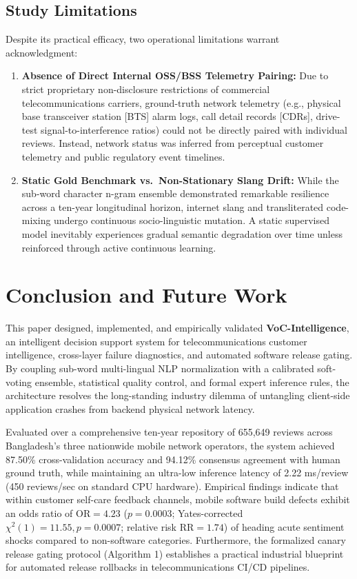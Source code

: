 \documentclass[review,12pt,authoryear]{elsarticle}
\begin{document}
\subsection{Study Limitations}
Despite its practical efficacy, two operational limitations warrant acknowledgment:
\begin{enumerate}
    \item \textbf{Absence of Direct Internal OSS/BSS Telemetry Pairing:} Due to strict proprietary non-disclosure restrictions of commercial telecommunications carriers, ground-truth network telemetry (e.g., physical base transceiver station [BTS] alarm logs, call detail records [CDRs], drive-test signal-to-interference ratios) could not be directly paired with individual reviews. Instead, network status was inferred from perceptual customer telemetry and public regulatory event timelines.
    \item \textbf{Static Gold Benchmark vs.\ Non-Stationary Slang Drift:} While the sub-word character n-gram ensemble demonstrated remarkable resilience across a ten-year longitudinal horizon, internet slang and transliterated code-mixing undergo continuous socio-linguistic mutation. A static supervised model inevitably experiences gradual semantic degradation over time unless reinforced through active continuous learning.
\end{enumerate}

\section{Conclusion and Future Work}
\label{sec:conclusion}

This paper designed, implemented, and empirically validated \textbf{VoC-Intelligence}, an intelligent decision support system for telecommunications customer intelligence, cross-layer failure diagnostics, and automated software release gating. By coupling sub-word multi-lingual NLP normalization with a calibrated soft-voting ensemble, statistical quality control, and formal expert inference rules, the architecture resolves the long-standing industry dilemma of untangling client-side application crashes from backend physical network latency.

Evaluated over a comprehensive ten-year repository of 655,649 reviews across Bangladesh's three nationwide mobile network operators, the system achieved 87.50\% cross-validation accuracy and 94.12\% consensus agreement with human ground truth, while maintaining an ultra-low inference latency of 2.22 ms/review (450 reviews/sec on standard CPU hardware). Empirical findings indicate that within customer self-care feedback channels, mobile software build defects exhibit an odds ratio of $\text{OR} = 4.23$ ($p = 0.0003$; Yates-corrected $\chi^2(1) = 11.55, p = 0.0007$; relative risk $\text{RR} = 1.74$) of heading acute sentiment shocks compared to non-software categories. Furthermore, the formalized canary release gating protocol (Algorithm 1) establishes a practical industrial blueprint for automated release rollbacks in telecommunications CI/CD pipelines.
\end{document}
